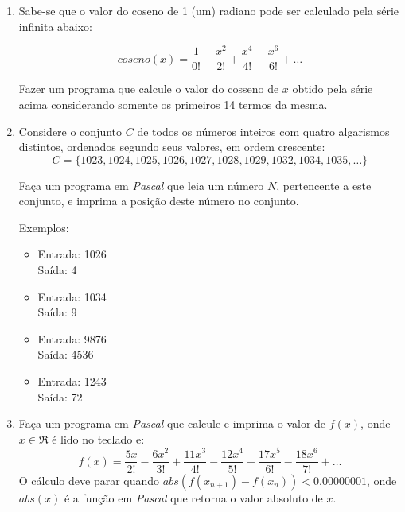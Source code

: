 \begin{enumerate}
\item Sabe-se  que o valor do coseno  de 1 (um) radiano  pode ser calculado
    pela série infinita abaixo:


\begin{center}
\[
coseno(x) = \frac{1}{0!} - \frac{x^2}{2!} + \frac{x^4}{4!} - \frac{x^6}{6!} 
           + \ldots
\]
\end{center}

    Fazer um  programa que calcule o  valor do cosseno de $x$ 
    obtido  pela série acima considerando somente os primeiros 14  
    termos da mesma.

\item Considere o conjunto $C$ de todos os números inteiros com quatro algarismos
distintos, ordenados segundo seus valores, em ordem crescente:
\begin{displaymath}
C = \{1023, 1024, 1025, 1026, 1027, 1028, 1029, 1032, 1034, 1035, \dots\}
\end{displaymath}

\vspace{-.2cm}
Faça um programa em \emph{Pascal} que leia um número $N$, pertencente a este
conjunto, e imprima a posição deste número no conjunto.

Exemplos:

\vspace{.1cm}
\begin{minipage}{2in}
\begin{itemize}
\item
Entrada: 1026\\
Saída: 4
\vspace{-.2cm}
\item
Entrada: 1034\\
Saída: 9
\end{itemize}
\end{minipage}
\begin{minipage}{2in}
\begin{itemize}
\item
Entrada: 9876\\
Saída: 4536
\vspace{-.2cm}
\item
Entrada: 1243\\
Saída: 72
\end{itemize}
\end{minipage}

\item Faça um programa em \emph{Pascal} que calcule e imprima o valor de $f(x)$, onde $x\in\Re$ é lido no teclado e:
\begin{equation*}
 f(x) = \frac{5x}{2!} - \frac{6x^2}{3!} + \frac{11x^3}{4!} - \frac{12x^4}{5!} + \frac{17x^5}{6!} - \frac{18x^6}{7!} + \ldots
\end{equation*}
O cálculo deve parar quando $abs(f(x_{n+1})-f(x_n)) < 0.00000001$, onde $abs(x)$ é a função em \emph{Pascal} que retorna o valor absoluto de $x$.


\end{enumerate}
